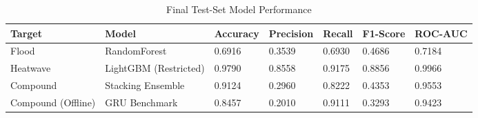 \begin{table}[t]
\centering
\caption{Final Test-Set Model Performance}
\label{tab:performance}
\begin{tabular}{@{}lllllll@{}}
\toprule
\textbf{Target} & \textbf{Model} & \textbf{Accuracy} & \textbf{Precision} & \textbf{Recall} & \textbf{F1-Score} & \textbf{ROC-AUC} \\
\midrule
Flood & RandomForest & 0.6916 & 0.3539 & 0.6930 & 0.4686 & 0.7184 \\
Heatwave & LightGBM (Restricted) & 0.9790 & 0.8558 & 0.9175 & 0.8856 & 0.9966 \\
Compound & Stacking Ensemble & 0.9124 & 0.2960 & 0.8222 & 0.4353 & 0.9553 \\
Compound (Offline) & GRU Benchmark & 0.8457 & 0.2010 & 0.9111 & 0.3293 & 0.9423 \\
\bottomrule
\end{tabular}
\end{table}